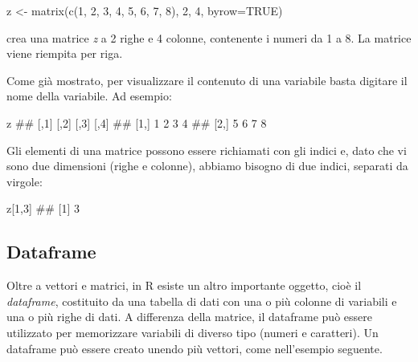 \documentclass[a4paper,12pt,oneside]{book}
\newenvironment{Shaded}{}{}
\newcommand{\KeywordTok}[1]{#1}
\newcommand{\DataTypeTok}[1]{#1}
\newcommand{\DecValTok}[1]{#1}
\newcommand{\StringTok}[1]{#1}
\newcommand{\CommentTok}[1]{#1}
\newcommand{\OtherTok}[1]{#1}
\newcommand{\NormalTok}[1]{#1}
\begin{document}
\begin{Shaded}
\begin{Highlighting}[]
\NormalTok{z  <-}\StringTok{  }\KeywordTok{matrix}\NormalTok{(}\KeywordTok{c}\NormalTok{(}\DecValTok{1}\NormalTok{, }\DecValTok{2}\NormalTok{, }\DecValTok{3}\NormalTok{, }\DecValTok{4}\NormalTok{, }\DecValTok{5}\NormalTok{, }\DecValTok{6}\NormalTok{, }\DecValTok{7}\NormalTok{, }\DecValTok{8}\NormalTok{), }\DecValTok{2}\NormalTok{, }\DecValTok{4}\NormalTok{, }
              \DataTypeTok{byrow=}\OtherTok{TRUE}\NormalTok{)}
\end{Highlighting}
\end{Shaded}

crea una matrice \emph{z} a 2 righe e 4 colonne, contenente i numeri da 1 a 8. La matrice viene riempita per riga.

Come già mostrato, per visualizzare il contenuto di una variabile basta digitare il nome della variabile. Ad esempio:

\begin{Shaded}
\begin{Highlighting}[]
\NormalTok{z}
\CommentTok{##      [,1] [,2] [,3] [,4]}
\CommentTok{## [1,]    1    2    3    4}
\CommentTok{## [2,]    5    6    7    8}
\end{Highlighting}
\end{Shaded}

Gli elementi di una matrice possono essere richiamati con gli indici e, dato che vi sono due dimensioni (righe e colonne), abbiamo bisogno di due indici, separati da virgole:

\begin{Shaded}
\begin{Highlighting}[]
\NormalTok{z[}\DecValTok{1}\NormalTok{,}\DecValTok{3}\NormalTok{]}
\CommentTok{## [1] 3}
\end{Highlighting}
\end{Shaded}

\hypertarget{dataframe}{%
\subsection*{Dataframe}\label{dataframe}}

Oltre a vettori e matrici, in R esiste un altro importante oggetto, cioè il \emph{dataframe}, costituito da una tabella di dati con una o più colonne di variabili e una o più righe di dati. A differenza della matrice, il dataframe può essere utilizzato per memorizzare variabili di diverso tipo (numeri e caratteri). Un dataframe può essere creato unendo più vettori, come nell'esempio seguente.
\end{document}
